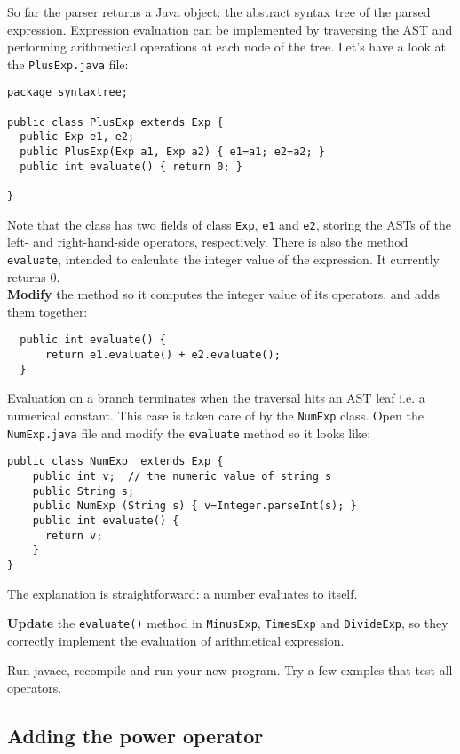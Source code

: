 \documentclass{article}
\begin{document}
So far the parser returns a Java object: the abstract syntax tree of the parsed expression. Expression evaluation can be implemented by traversing the AST and performing arithmetical operations at each node of the tree. Let's have a look at the \verb+PlusExp.java+ file:
\begin{verbatim}
package syntaxtree;

public class PlusExp extends Exp {
  public Exp e1, e2;
  public PlusExp(Exp a1, Exp a2) { e1=a1; e2=a2; }
  public int evaluate() { return 0; }

}
\end{verbatim}
Note that the class has two fields of class \verb+Exp+, \verb+e1+ and \verb+e2+, storing the ASTs of the left- and right-hand-side operators, respectively. There is also the method \verb+evaluate+, intended to calculate the integer value of the expression. It currently returns 0.\\
 \textbf{Modify} the method so it computes the integer value of its operators, and adds them together:

\begin{verbatim}
  public int evaluate() { 
      return e1.evaluate() + e2.evaluate();
  }
\end{verbatim}

Evaluation on a branch terminates when the traversal hits an AST leaf i.e. a numerical constant. This case is taken care of by the \verb+NumExp+ class. Open the \verb+NumExp.java+ file and modify the \verb+evaluate+  method so it looks like:

\begin{verbatim}
public class NumExp  extends Exp {
    public int v;  // the numeric value of string s
    public String s;
    public NumExp (String s) { v=Integer.parseInt(s); }
    public int evaluate() { 
      return v;
    }
}
\end{verbatim}
The explanation is straightforward: a number evaluates to itself.

\textbf{Update} the \verb+evaluate()+ method in \verb+MinusExp+, \verb+TimesExp+ and \verb+DivideExp+, so they correctly implement the evaluation of arithmetical expression.

Run javacc, recompile and run your new program. Try a few exmples that test all operators.


\subsection*{Adding the power operator}
\end{document}
